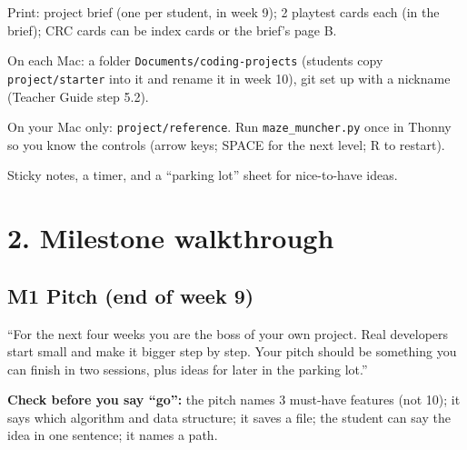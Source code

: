 \documentclass[level=3,teacher]{kidscode}
\begin{document}
\begin{materials}
  \item Print: project brief (one per student, in week 9); 2 playtest cards each (in the brief);
        CRC cards can be index cards or the brief's page B.
  \item On each Mac: a folder \texttt{Documents/coding-projects} (students copy
        \texttt{project/starter} into it and rename it in week 10), git set up with a nickname
        (Teacher Guide step 5.2).
  \item On your Mac only: \texttt{project/reference}. Run \texttt{maze\_muncher.py} once in Thonny
        so you know the controls (arrow keys; SPACE for the next level; R to restart).
  \item Sticky notes, a timer, and a \enquote{parking lot} sheet for nice-to-have ideas.
\end{materials}

\section{2. Milestone walkthrough}

\subsection{M1 Pitch (end of week 9)}
\begin{teacherscript}
\enquote{For the next four weeks you are the boss of your own project. Real developers start
small and make it bigger step by step. Your pitch should be something you can finish in two
sessions, plus ideas for later in the parking lot.}
\end{teacherscript}
\textbf{Check before you say \enquote{go}:} the pitch names 3 must-have features (not 10); it says
which algorithm and data structure; it saves a file; the student can say the idea in one sentence;
it names a path.
\end{document}
